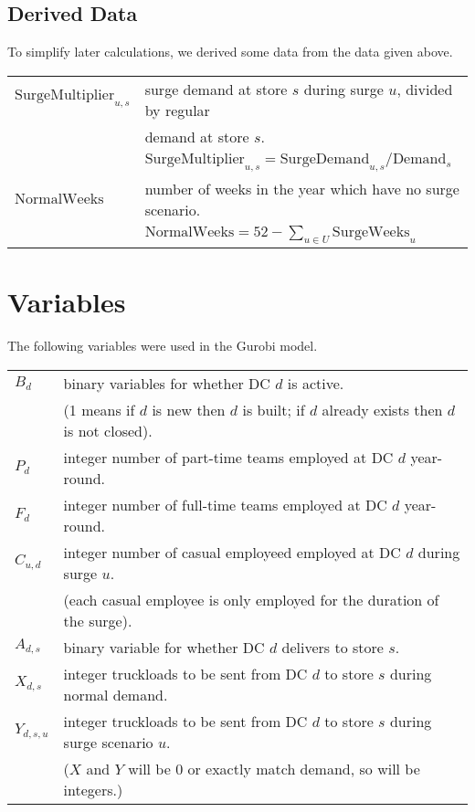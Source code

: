 \documentclass[11pt,a4paper]{article}
\begin{document}
\subsection{Derived Data}
To simplify later calculations, we derived some data from the data given above.\\[0.8em]    
\begin{tabular}{l l}
    $\mathrm{SurgeMultiplier}_{u,s}$ & surge demand at store $s$ during surge $u$,  divided by regular \\ 
    &  demand at store $s$. \\ 
    &$\mathrm{SurgeMultiplier}_{u,s} = \mathrm{SurgeDemand}_{u,s} / \mathrm{Demand}_s $ \\
    $\mathrm{NormalWeeks}$ & number of weeks in the year which have no surge scenario. \\ 
    & $\mathrm{NormalWeeks} = 52-\sum_{u \in U} \mathrm{SurgeWeeks}_u $
\end{tabular}

\section{Variables}
The following variables were used in the Gurobi model.\\[0.8em]
\begin{tabular}{l l}
    $B_{d}$ & binary variables for whether DC $d$ is active. \\ 
    & (1 means if $d$ is new then $d$ is built; if $d$ 
    already exists then $d$ is not closed). \\
    $P_d$ & integer number of part-time teams employed at DC $d$ year-round. \\ 
    $F_d$ & integer number of full-time teams employed at DC $d$ year-round. \\ 
    $C_{u,d}$ & integer number of casual employeed employed at DC $d$  during surge $u$. \\
    & (each casual employee is only employed for the duration of the surge). \\ 
    $A_{d,s}$ & binary variable for whether DC $d$ delivers to store $s$. \\  
    $X_{d,s}$ & integer truckloads to be sent from DC $d$ to store $s$ during normal demand. \\
    $Y_{d,s,u}$ & integer truckloads to be sent from DC $d$ to store $s$ during 
    surge scenario $u$.  \\ 
    & ($X$ and $Y$ will be 0 or exactly match demand, so will be integers.)
\end{tabular}
\\[0.8em]
\end{document}

